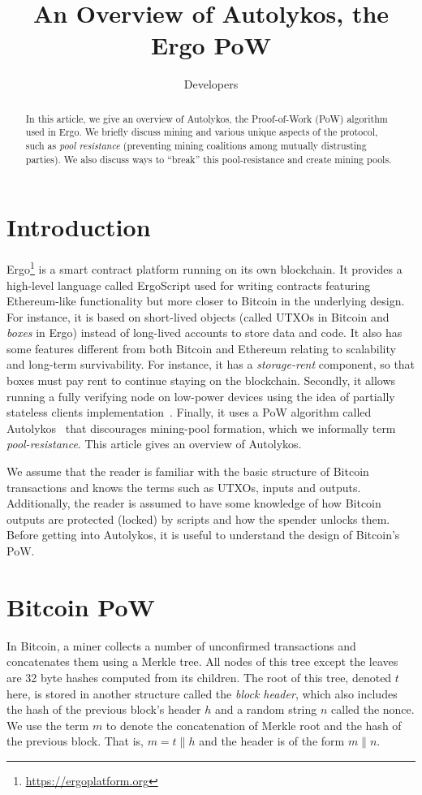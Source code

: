 \documentclass[11pt]{article}
\newcommand{\langname}{ErgoScript\xspace}
\newcommand{\powname}{Autolykos\xspace}
\begin{document}
\title{An Overview of \powname, the Ergo PoW}
\author{Developers}
\maketitle

\begin{abstract}
	In this article, we give an overview of \powname, the Proof-of-Work (PoW) algorithm used in Ergo. We briefly discuss mining and various unique aspects of the protocol, such as {\em pool resistance} (preventing mining coalitions among mutually distrusting parties). We also discuss ways to ``break'' this pool-resistance and create mining pools. 
	 
\end{abstract}

\section{Introduction}

Ergo\footnote{\url{https://ergoplatform.org}} is a smart contract platform running on its own blockchain. It provides a high-level language called \langname used for writing contracts featuring Ethereum-like functionality but more closer to Bitcoin in the underlying design. For instance, it is based on short-lived objects (called UTXOs in Bitcoin and {\em boxes} in Ergo) instead of long-lived accounts to store data and code. It also has some features different from both Bitcoin and Ethereum relating to scalability and long-term survivability. For instance, it has a {\em storage-rent} component, so that boxes must pay rent to continue staying on the blockchain. Secondly, it allows running a fully verifying node on low-power devices using the idea of partially stateless clients implementation~\cite{RMCI17}. Finally, it uses a PoW algorithm called \powname~\cite{autolykos} that discourages mining-pool formation, which we informally term {\em pool-resistance}. This article gives an overview of \powname. 

We assume that the reader is familiar with the basic structure of Bitcoin transactions and knows the terms such as UTXOs, inputs and outputs. Additionally, the reader is assumed to have some knowledge of how Bitcoin outputs are protected (locked) by scripts and how the spender unlocks them. 
Before getting into \powname, it is useful to understand the design of Bitcoin's PoW. 


\section{Bitcoin PoW}
In Bitcoin, a miner collects a number of unconfirmed transactions and concatenates them using a Merkle tree. All nodes of this tree except the leaves are 32 byte hashes computed from its children. The root of this tree, denoted $t$ here, is stored in another structure called the {\em block header}, which also includes the hash of the previous block's header $h$ and a random string $n$ called the nonce. We use the term $m$ to denote the concatenation of Merkle root and the hash of the previous block. 
That is, $m = t\|h$ and the header is of the form $m\|n$. 
\end{document}
